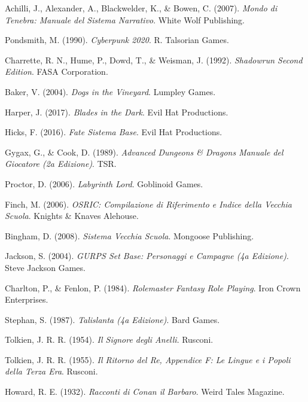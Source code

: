 Achilli, J., Alexander, A., Blackwelder, K., \& Bowen, C. (2007). 
\textit{Mondo di Tenebra: Manuale del Sistema Narrativo}. 
White Wolf Publishing.

Pondsmith, M. (1990).
\textit{Cyberpunk 2020}.
R. Talsorian Games.

Charrette, R. N., Hume, P., Dowd, T., \& Weisman, J. (1992).
\textit{Shadowrun Second Edition}.
FASA Corporation.

Baker, V. (2004).
\textit{Dogs in the Vineyard}.
Lumpley Games.

Harper, J. (2017).
\textit{Blades in the Dark}.
Evil Hat Productions.

Hicks, F. (2016).
\textit{Fate Sistema Base}.
Evil Hat Productions.

Gygax, G., \& Cook, D. (1989).
\textit{Advanced Dungeons \& Dragons Manuale del Giocatore (2a Edizione)}.
TSR.

Proctor, D. (2006).
\textit{Labyrinth Lord}.
Goblinoid Games.

Finch, M. (2006).
\textit{OSRIC: Compilazione di Riferimento e Indice della Vecchia Scuola}.
Knights \& Knaves Alehouse.

Bingham, D. (2008).
\textit{Sistema Vecchia Scuola}.
Mongoose Publishing.

Jackson, S. (2004).
\textit{GURPS Set Base: Personaggi e Campagne (4a Edizione)}.
Steve Jackson Games.

Charlton, P., \& Fenlon, P. (1984).
\textit{Rolemaster Fantasy Role Playing}.
Iron Crown Enterprises.

Stephan, S. (1987).
\textit{Talislanta (4a Edizione)}.
Bard Games.

Tolkien, J. R. R. (1954).
\textit{Il Signore degli Anelli}.
Rusconi.

Tolkien, J. R. R. (1955).
\textit{Il Ritorno del Re, Appendice F: Le Lingue e i Popoli della Terza Era}.
Rusconi.

Howard, R. E. (1932).
\textit{Racconti di Conan il Barbaro}.
Weird Tales Magazine.

